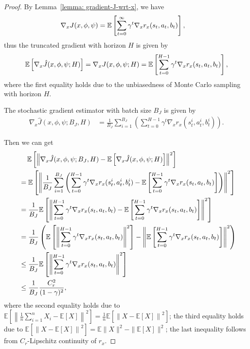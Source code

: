 \documentclass{article}
\theoremstyle{plain}
\theoremstyle{definition}
\theoremstyle{remark}
\def\E{\mathbb E}
\begin{document}
\begin{proof}
    By Lemma~\ref{lemma: gradient-J-wrt-x}, we have
    \begin{align}
        \nabla_x J(x,\phi,\psi) & = \E  \left[\sum_{t=0}^{\infty} \gamma^t \nabla_x r_x(s_t,a_t,b_t) \right],\notag
    \end{align}
    thus the truncated gradient with horizon $H$ is given by
    \begin{align}
         \E \left[ \nabla_x \hat{J}(x,\phi,\psi;H) \right] = \nabla_x J(x,\phi,\psi;H) = \E  \left[\sum_{t=0}^{H-1} \gamma^t \nabla_x r_x(s_t,a_t,b_t) \right], \notag 
    \end{align}
    where the first equality holds due to the unbiasedness of Monte Carlo sampling with horizon $H$.

    The stochastic gradient estimator with batch size $B_J$ is given by
    \begin{align}
        \nabla_x \hat{J}(x,\phi,\psi;B_J,H) & = \frac{1}{B_J} \sum_{i=1}^{B_J} \left( \sum_{t=0}^{H-1} \gamma^t \nabla_x r_x(s_t^i,a_t^i,b_t^i) \right). 
    \end{align}

    Then we can get
    \begin{align}
        & \quad \,\E \left[ \left\| \nabla_x \hat{J}(x,\phi,\psi;B_J,H) - \E \left[ \nabla_x \hat{J}(x,\phi,\psi;H) \right]\right\|^2 \right] \notag \\
        & = \E \left[ \left\| \frac{1}{B_J} \sum_{i=1}^{B_J} \left( \sum_{t=0}^{H-1} \gamma^t \nabla_x r_x(s_t^i,a_t^i,b_t^i) - \E  \left[\sum_{t=0}^{H-1} \gamma^t \nabla_x r_x(s_t,a_t,b_t) \right] \right) \right\|^2 \right]\label{eq: variance-bound-of-nabla-x-J-start}  \\
        & = \frac{1}{B_J} \E \left[ \left\| \sum_{t=0}^{H-1} \gamma^t \nabla_x r_x(s_t,a_t,b_t) - \E  \left[\sum_{t=0}^{H-1} \gamma^t \nabla_x r_x(s_t,a_t,b_t) \right] \right\|^2 \right] \\\
        & =  \frac{1}{B_J} \left( \E \left[ \left\| \sum_{t=0}^{H-1} \gamma^t \nabla_x r_x(s_t,a_t,b_t) \right\|^2 \right] - \left\| \E  \left[\sum_{t=0}^{H-1} \gamma^t \nabla_x r_x(s_t,a_t,b_t) \right] \right\|^2 \right) \\
        & \leq \frac{1}{B_J} \E \left[ \left\| \sum_{t=0}^{H-1} \gamma^t \nabla_x r_x(s_t,a_t,b_t) \right\|^2 \right] \label{eq: variance-bound-of-nabla-x-J-end}\\
        & \leq \frac{1}{B_J} \frac{C_r^2}{(1-\gamma)^2},
    \end{align}
    where the second equality holds due to $\E\left[\left\|\frac{1}{n}\sum_{i=1}^n X_i - \E [X]\right\|^2\right] = \frac{1}{n}\E \left[ \left\| X - \E [X]\right\|^2 \right]$; the third equality holds due to $\E\left[\left\| X - \E [X] \right\|^2\right] = \E \| X\|^2 - \| \E [X]\|^2$; the last inequality follows from $C_r$-Lipschitz continuity of $r_x$.


\end{proof}
\end{document}
